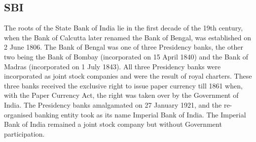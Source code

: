 \documentclass[a4paper, 12pt]{extarticle}
\begin{document}
{%

\subsection{SBI}
\par The roots of the State Bank of India lie in the first decade of the 19th century, when the Bank of Calcutta later renamed the Bank of Bengal, was established on 2 June 1806. The Bank of Bengal was one of three Presidency banks, the other two being the Bank of Bombay (incorporated on 15 April 1840) and the Bank of Madras (incorporated on 1 July 1843). All three Presidency banks were incorporated as joint stock companies and were the result of royal charters. These three banks received the exclusive right to issue paper currency till 1861 when, with the Paper Currency Act, the right was taken over by the Government of India. The Presidency banks amalgamated on 27 January 1921, and the re-organised banking entity took as its name Imperial Bank of India. The Imperial Bank of India remained a joint stock company but without Government participation.

}
\end{document}
